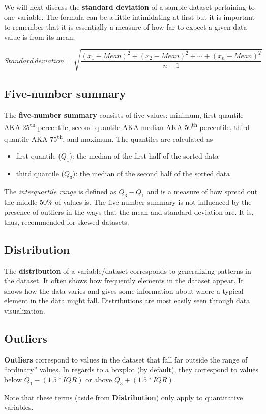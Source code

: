 \documentclass[]{book}
\providecommand{\tightlist}{%
  \setlength{\itemsep}{0pt}\setlength{\parskip}{0pt}}
\begin{document}
We will next discuss the \textbf{standard deviation} of a sample dataset pertaining to one variable. The formula can be a little intimidating at first but it is important to remember that it is essentially a measure of how far to expect a given data value is from its mean:

\[Standard \, deviation = \sqrt{\frac{(x_1 - Mean)^2 + (x_2 - Mean)^2 + \cdots + (x_n - Mean)^2}{n - 1}}\]

\hypertarget{five-number-summary}{%
\subsection{Five-number summary}\label{five-number-summary}}

The \textbf{five-number summary} consists of five values: minimum, first quantile AKA 25\textsuperscript{th} percentile, second quantile AKA median AKA 50\textsuperscript{th} percentile, third quantile AKA 75\textsuperscript{th}, and maximum. The quantiles are calculated as

\begin{itemize}
\tightlist
\item
  first quantile (\(Q_1\)): the median of the first half of the sorted data
\item
  third quantile (\(Q_3\)): the median of the second half of the sorted data
\end{itemize}

The \emph{interquartile range} is defined as \(Q_3 - Q_1\) and is a measure of how spread out the middle 50\% of values is. The five-number summary is not influenced by the presence of outliers in the ways that the mean and standard deviation are. It is, thus, recommended for skewed datasets.

\hypertarget{distribution}{%
\subsection{Distribution}\label{distribution}}

The \textbf{distribution} of a variable/dataset corresponds to generalizing patterns in the dataset. It often shows how frequently elements in the dataset appear. It shows how the data varies and gives some information about where a typical element in the data might fall. Distributions are most easily seen through data visualization.

\hypertarget{outliers}{%
\subsection{Outliers}\label{outliers}}

\textbf{Outliers} correspond to values in the dataset that fall far outside the range of ``ordinary'' values. In regards to a boxplot (by default), they correspond to values below \(Q_1 - (1.5 * IQR)\) or above \(Q_3 + (1.5 * IQR)\).

Note that these terms (aside from \textbf{Distribution}) only apply to quantitative variables.


\end{document}
